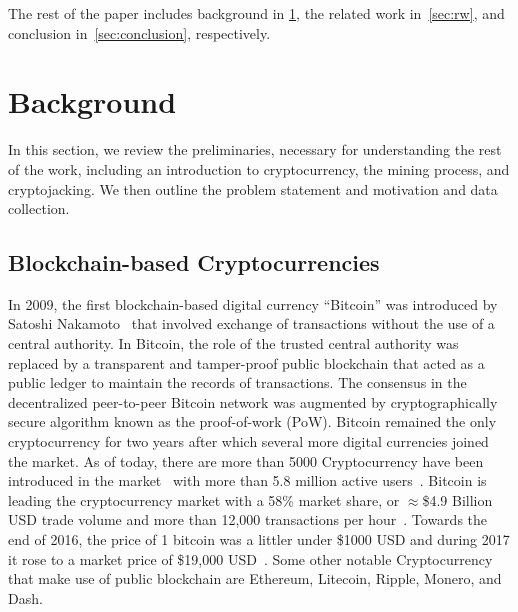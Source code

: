 \documentclass[acmlarge]{acmart}
\newcommand{\cc}{{cryptocurrency}\xspace}
\newcommand{\Cc}{{Cryptocurrency}\xspace}
\newcommand{\cj}{cryptojacking\xspace}
\begin{document}
The rest of the paper includes background in \textsection\ref{sec:background}, the related work in~\textsection\ref{sec:rw}, and conclusion in~\textsection\ref{sec:conclusion}, respectively. 


\section{Background}\label{sec:background}
In this section, we review the preliminaries, necessary for understanding the rest of the work, including an introduction to \cc, the mining process, and \cj. We then outline the problem statement and motivation and data collection. 



\subsection{Blockchain-based Cryptocurrencies}\label{sec:cryptos}
In 2009, the first blockchain-based digital currency ``Bitcoin'' was introduced by Satoshi Nakamoto~\cite{nakamoto2008bitcoin} that involved exchange of transactions without the use of a central authority. In Bitcoin, the role of the trusted central authority was replaced by a transparent and tamper-proof public blockchain that acted as a public ledger to maintain the records of transactions.  The consensus in the decentralized peer-to-peer Bitcoin network was augmented by cryptographically secure algorithm known as the proof-of-work (PoW). Bitcoin remained the only \cc for two years after which several more digital currencies joined the market. As of today, there are more than 5000 \Cc have been introduced in the market~\cite{atozforex} with more than 5.8 million active users~\cite{hileman2017global}. Bitcoin is leading the \cc market with a 58\% market share, or $\approx$\$4.9 Billion USD trade volume and more than 12,000 transactions per hour~\cite{bitcoinnews_2017}. 
Towards the end of 2016, the price of 1 bitcoin was a littler under \$1000 USD and during 2017 it rose to a market price of \$19,000 USD~\cite{blockexplorer}. Some other notable \Cc that make use of public blockchain are Ethereum, Litecoin, Ripple, Monero, and Dash. 
\end{document}

